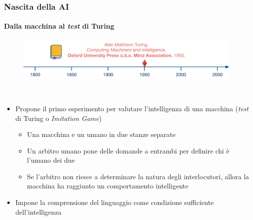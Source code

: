 \begin{frame}[t] \frametitle{Nascita della AI}
    {\scriptsize
        \framesubtitle{Dalla macchina al \textit{test} di Turing}
        \vspace*{-.5cm}
	    \begin{minipage}[t]{\textwidth}
		    \begin{figure}[ht]
			    \centering
			    \includegraphics[width=\textwidth]{img/AI-timeline-1950-alt.png}
		    \end{figure}
	    \end{minipage}
	    \\\vspace*{.3cm}
	    \begin{minipage}[t]{\textwidth}
		    \begin{minipage}[t]{0.6\textwidth}
			    \begin{itemize}[leftmargin=10pt,align=right]
				    \onslide<2->\item[\alert{\faHandORight}] Propone il primo esperimento per valutare l'intelligenza di una macchina (\alert{\textit{test} di Turing} o \alert{\textit{Imitation Game}})
				    \onslide<3->\begin{itemize}[leftmargin=10pt,align=right]
						\item[\alert{\faHandORight}] Una macchina e un umano in due stanze separate
						\item[\alert{\faHandORight}] Un arbitro umano pone delle domande a entrambi per definire chi è l'umano dei due
						\item[\alert{\faHandORight}] Se l'arbitro non riesce a determinare la natura degli interlocutori, allora la macchina ha raggiunto un comportamento intelligente
				    \end{itemize}
				    \item[\alert{\faHandORight}] Impone la comprensione del linguaggio come \alert{condizione sufficiente} dell'intelligenza
			    \end{itemize}
		    \end{minipage}
		    \begin{minipage}[t]{0.4\textwidth}
			    \centering
			    \begin{figure}[ht]

\end{figure}
\end{minipage}
\end{minipage}}
\end{frame}

